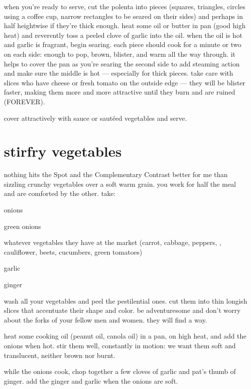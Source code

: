 when you're ready to serve, cut the polenta into pieces (squares, triangles, 
circles using a coffee cup, narrow rectangles to be seared on their sides) 
and perhaps in half heightwise if they're thick enough. heat some oil or 
butter in pan (good high heat) and reverently toss a peeled clove of garlic 
into the oil. when the oil is hot and garlic is fragrant, begin searing. each 
piece should cook for a minute or two on each side: enough to pop, brown, 
blister, and warm all the way through. it helps to cover the pan as you're 
searing the second side to add steaming action and make sure the middle is 
hot --- especially for thick pieces. take care with slices who have cheese or 
fresh tomato on the outside edge --- they will be blister faster, making them 
more and more attractive until they burn and are ruined (FOREVER).

cover attractively with sauce or saut\'{e}ed vegetables and serve.

\section{stirfry vegetables}

nothing hits the Spot and the Complementary Contrast better for me than 
sizzling crunchy vegetables over a soft warm grain. you work for half the 
meal and are comforted by the other. take:

\begin{ingredients}
  \item onions
  \item green onions
  \item whatever vegetables they have at the market (carrot, cabbage, peppers, 
  , cauliflower, beets, cucumbers, green tomatoes)
  \item garlic
  \item ginger
\end{ingredients}
wash all your vegetables and peel the pestilential ones. cut them into thin longish slices that accentuate their shape and color. be adventuresome and don't worry about the forks of your fellow men and women. they will find a way.

heat some cooking oil (peanut oil, canola oil) in a pan, on high heat, and 
add the onions when hot. stir them well, constantly in motion: we want them 
soft and translucent, neither brown nor burnt.

while the onions cook, chop together a few cloves of garlic and pat's thumb 
of ginger. add the ginger and garlic when the onions are soft.


